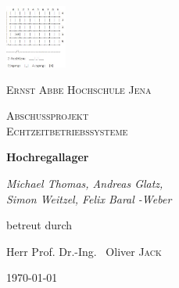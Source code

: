 \documentclass[a4paper, 12pt]{scrartcl}
\begin{document}
\begin{titlepage}
	\centering
	\includegraphics[width=0.15\textwidth]{diagrams/console_output.JPG}\par\vspace{1cm}
	{\scshape\LARGE Ernst Abbe Hochschule Jena\par}
	\vspace{1cm}
	{\scshape\Large Abschussprojekt \\ Echtzeitbetriebssysteme\par}
	\vspace{1.5cm}
	{\huge\bfseries Hochregallager\par}
	\vspace{2cm}
	{\Large\itshape Michael Thomas, Andreas Glatz,\\ Simon Weitzel, Felix Baral -Weber \par}
	\vfill
	betreut durch\par
	Herr  Prof. Dr.-Ing. ~Oliver \textsc{Jack}

	\vfill

	{\large \today\par}
\end{titlepage}

\newpage %
\thispagestyle{empty} %
\newpage %

\tableofcontents
\pagebreak

\pagebreak

\pagebreak

\pagebreak

%
\end{document}
